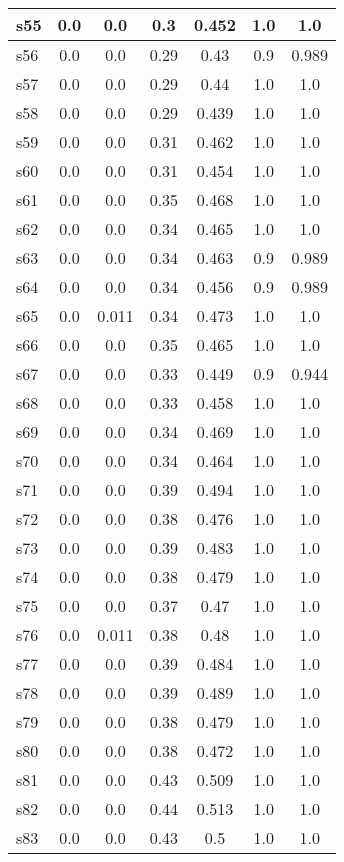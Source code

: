 \documentclass{article}
\begin{document}
\begin{tabular}{|l|c|c|c|c|c|c|}
s55 &0.0 & 0.0 & 0.3 & 0.452 & 1.0 & 1.0\\
\hline
s56 &0.0 & 0.0 & 0.29 & 0.43 & 0.9 & 0.989\\
\hline
s57 &0.0 & 0.0 & 0.29 & 0.44 & 1.0 & 1.0\\
\hline
s58 &0.0 & 0.0 & 0.29 & 0.439 & 1.0 & 1.0\\
\hline
s59 &0.0 & 0.0 & 0.31 & 0.462 & 1.0 & 1.0\\
\hline
s60 &0.0 & 0.0 & 0.31 & 0.454 & 1.0 & 1.0\\
\hline
s61 &0.0 & 0.0 & 0.35 & 0.468 & 1.0 & 1.0\\
\hline
s62 &0.0 & 0.0 & 0.34 & 0.465 & 1.0 & 1.0\\
\hline
s63 &0.0 & 0.0 & 0.34 & 0.463 & 0.9 & 0.989\\
\hline
s64 &0.0 & 0.0 & 0.34 & 0.456 & 0.9 & 0.989\\
\hline
s65 &0.0 & 0.011 & 0.34 & 0.473 & 1.0 & 1.0\\
\hline
s66 &0.0 & 0.0 & 0.35 & 0.465 & 1.0 & 1.0\\
\hline
s67 &0.0 & 0.0 & 0.33 & 0.449 & 0.9 & 0.944\\
\hline
s68 &0.0 & 0.0 & 0.33 & 0.458 & 1.0 & 1.0\\
\hline
s69 &0.0 & 0.0 & 0.34 & 0.469 & 1.0 & 1.0\\
\hline
s70 &0.0 & 0.0 & 0.34 & 0.464 & 1.0 & 1.0\\
\hline
s71 &0.0 & 0.0 & 0.39 & 0.494 & 1.0 & 1.0\\
\hline
s72 &0.0 & 0.0 & 0.38 & 0.476 & 1.0 & 1.0\\
\hline
s73 &0.0 & 0.0 & 0.39 & 0.483 & 1.0 & 1.0\\
\hline
s74 &0.0 & 0.0 & 0.38 & 0.479 & 1.0 & 1.0\\
\hline
s75 &0.0 & 0.0 & 0.37 & 0.47 & 1.0 & 1.0\\
\hline
s76 &0.0 & 0.011 & 0.38 & 0.48 & 1.0 & 1.0\\
\hline
s77 &0.0 & 0.0 & 0.39 & 0.484 & 1.0 & 1.0\\
\hline
s78 &0.0 & 0.0 & 0.39 & 0.489 & 1.0 & 1.0\\
\hline
s79 &0.0 & 0.0 & 0.38 & 0.479 & 1.0 & 1.0\\
\hline
s80 &0.0 & 0.0 & 0.38 & 0.472 & 1.0 & 1.0\\
\hline
s81 &0.0 & 0.0 & 0.43 & 0.509 & 1.0 & 1.0\\
\hline
s82 &0.0 & 0.0 & 0.44 & 0.513 & 1.0 & 1.0\\
\hline
s83 &0.0 & 0.0 & 0.43 & 0.5 & 1.0 & 1.0\\

\end{tabular}
\end{document}
